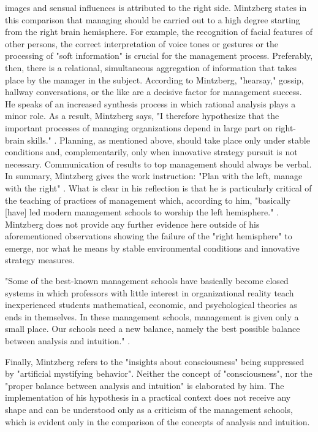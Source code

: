 \documentclass[a4paper,12pt]{article}
\begin{document}
images and sensual influences is attributed to the right side. Mintzberg
states in this comparison that managing should be carried out to a high degree
starting from the right brain hemisphere. For example, the recognition of
facial features of other persons, the correct interpretation of voice tones or
gestures or the processing of "soft information" is crucial for the management
process. Preferably, then, there is a relational, simultaneous aggregation of
information that takes place by the manager in the subject. According to
Mintzberg, "hearsay," gossip, hallway conversations, or the like are a
decisive factor for management success. He speaks of an increased synthesis
process in which rational analysis plays a minor role. As a result, Mintzberg
says, "I therefore hypothesize that the important processes of managing
organizations depend in large part on right-brain skills."
\cite[p. 63]{Mintzberg}. Planning, as mentioned above, should take place only
under stable conditions and, complementarily, only when innovative strategy
pursuit is not necessary. Communication of results to top management should
always be verbal. In summary, Mintzberg gives the work instruction: "Plan with
the left, manage with the right" \cite[p. 57]{Mintzberg}. What is clear in his
reflection is that he is particularly critical of the teaching of practices of
management which, according to him, "basically [have] led modern management
schools to worship the left hemisphere." \cite[p. 68]{Mintzberg}. Mintzberg
does not provide any further evidence here outside of his aforementioned
observations showing the failure of the "right hemisphere" to emerge, nor what
he means by stable environmental conditions and innovative strategy measures.

"Some of the best-known management schools have basically become closed
systems in which professors with little interest in organizational reality
teach inexperienced students mathematical, economic, and psychological
theories as ends in themselves. In these management schools, management is
given only a small place. Our schools need a new balance, namely the best
possible balance between analysis and intuition." \cite[p. 68]{Mintzberg}.

Finally, Mintzberg refers to the "insights about consciousness"
\cite[p. 68]{Mintzberg} being suppressed by "artificial mystifying behavior".
Neither the concept of "consciousness", nor the "proper balance between
analysis and intuition" is elaborated by him. The implementation of his
hypothesis in a practical context does not receive any shape and can be
understood only as a criticism of the management schools, which is evident
only in the comparison of the concepts of analysis and intuition.
\end{document}
